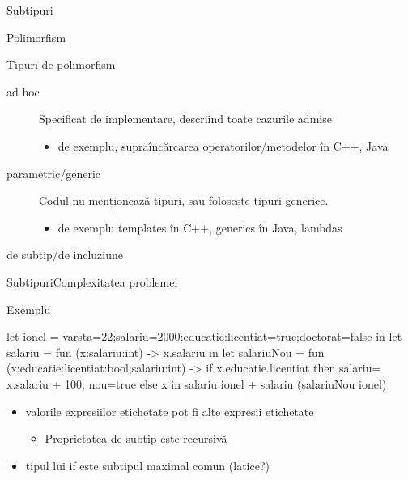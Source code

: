 \documentclass[xcolor=pdftex,romanian,colorlinks]{beamer}
\begin{document}
\begin{section}{Subtipuri}
\begin{frame}{Polimorfism}
\begin{block}{Tipuri de polimorfism}
 \begin{description}
   \item[ad hoc] Specificat de implementare, descriind toate cazurile admise
     \begin{itemize}
       \item de exemplu, supraîncărcarea operatorilor/metodelor în C++, Java
     \end{itemize}
   \item[parametric/generic] Codul nu menționează tipuri, sau folosește tipuri generice.
     \begin{itemize}
       \item de exemplu templates în C++, generics în Java, lambdas
     \end{itemize}
  \item[de subtip/de incluziune] 
 \end{description}
\end{block}
\end{frame}

\begin{frame}[fragile]{Subtipuri}{Complexitatea problemei}
\begin{block}{Exemplu}
\begin{asciiml}
let ionel = {varsta=22;salariu=2000;educatie:{licentiat=true;doctorat=false}} in
let salariu = fun (x:{salariu:int}) -> x.salariu in
let salariuNou = fun (x:{educatie:{licentiat:bool};salariu:int}) 
   -> if x.educatie.licentiat then {salariu= x.salariu + 100; nou=true}
                              else x
in salariu ionel + salariu (salariuNou ionel)
\end{asciiml}

\end{block}
\vfill
\begin{itemize}
\item valorile expresiilor etichetate pot fi alte expresii etichetate
  \begin{itemize}
    \item Proprietatea de subtip este recursivă
  \end{itemize}
\item tipul lui if este subtipul maximal comun (latice?) 
\end{itemize}
\end{frame}


\end{section}
\end{document}
